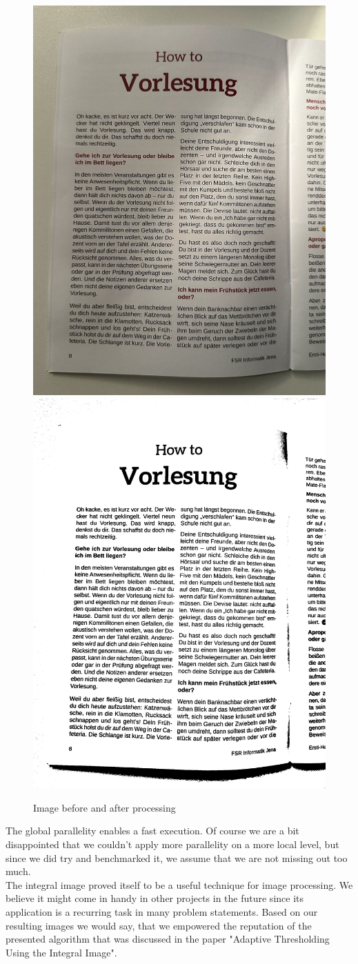 \documentclass[sigconf]{acmart}
\begin{document}
\begin{figure}[htbp]
  \centering
    \includegraphics[width=0.45\linewidth]{./graphics/heft_4.jpg} 
    \includegraphics[width=0.45\linewidth]{./graphics/heft_4_binarized.jpg} 
    \caption{Image before and after processing}
\end{figure}

The global parallelity enables a fast execution. Of course we are a bit disappointed that we couldn't apply more parallelity on a more local level, but since we did try and benchmarked it, we assume that we are not missing out too much.\\
The integral image proved itself to be a useful technique for image processing. We believe it might come in handy in other projects in the future since its application is a recurring task in many problem statements. Based on our resulting images we would say, that we empowered the reputation of the presented algorithm that was discussed in the paper "Adaptive Thresholding Using the Integral Image". 
\end{document}
